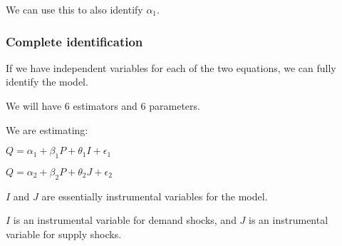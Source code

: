 We can use this to also identify \(\alpha_1\).

\subsubsection{Complete identification}

If we have independent variables for each of the two equations, we can fully identify the model.

We will have \(6\) estimators and \(6\) parameters.

We are estimating:

\(Q=\alpha_1 + \beta_1 P + \theta_1 I + \epsilon_1 \)

\(Q=\alpha_2 + \beta_2 P + \theta_2 J + \epsilon_2 \)

\(I\) and \(J\) are essentially instrumental variables for the model.

\(I\) is an instrumental variable for demand shocks, and \(J\) is an instrumental variable for supply shocks.

